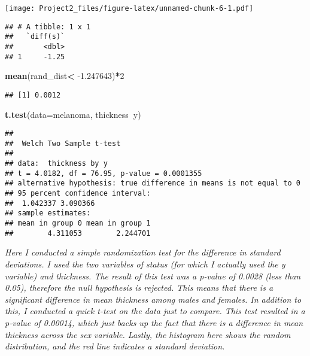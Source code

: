\documentclass[]{article}
\newenvironment{Shaded}{\begin{snugshade}}{\end{snugshade}}
\newcommand{\DataTypeTok}[1]{\textcolor[rgb]{0.13,0.29,0.53}{#1}}
\newcommand{\DecValTok}[1]{\textcolor[rgb]{0.00,0.00,0.81}{#1}}
\newcommand{\FloatTok}[1]{\textcolor[rgb]{0.00,0.00,0.81}{#1}}
\newcommand{\KeywordTok}[1]{\textcolor[rgb]{0.13,0.29,0.53}{\textbf{#1}}}
\newcommand{\NormalTok}[1]{#1}
\newcommand{\OperatorTok}[1]{\textcolor[rgb]{0.81,0.36,0.00}{\textbf{#1}}}
\newcommand{\StringTok}[1]{\textcolor[rgb]{0.31,0.60,0.02}{#1}}
\begin{document}
\texttt{[image: Project2\_files/figure-latex/unnamed-chunk-6-1.pdf]}

\begin{Shaded}
\end{Shaded}

\begin{verbatim}
## # A tibble: 1 x 1
##   `diff(s)`
##       <dbl>
## 1     -1.25
\end{verbatim}

\begin{Shaded}
\begin{Highlighting}[]
\KeywordTok{mean}\NormalTok{(rand_dist}\OperatorTok{<}\StringTok{ }\FloatTok{-1.247643}\NormalTok{)}\OperatorTok{*}\DecValTok{2}
\end{Highlighting}
\end{Shaded}

\begin{verbatim}
## [1] 0.0012
\end{verbatim}

\begin{Shaded}
\begin{Highlighting}[]
\KeywordTok{t.test}\NormalTok{(}\DataTypeTok{data=}\NormalTok{melanoma, thickness}\OperatorTok{~}\NormalTok{y)}
\end{Highlighting}
\end{Shaded}

\begin{verbatim}
## 
##  Welch Two Sample t-test
## 
## data:  thickness by y
## t = 4.0182, df = 76.95, p-value = 0.0001355
## alternative hypothesis: true difference in means is not equal to 0
## 95 percent confidence interval:
##  1.042337 3.090366
## sample estimates:
## mean in group 0 mean in group 1 
##        4.311053        2.244701
\end{verbatim}

\emph{Here I conducted a simple randomization test for the difference in
standard deviations. I used the two variables of status (for which I
actually used the y variable) and thickness. The result of this test was
a p-value of 0.0028 (less than 0.05), therefore the null hypothesis is
rejected. This means that there is a significant difference in mean
thickness among males and females. In addition to this, I conducted a
quick t-test on the data just to compare. This test resulted in a
p-value of 0.00014, which just backs up the fact that there is a
difference in mean thickness across the sex variable. Lastly, the
histogram here shows the random distribution, and the red line indicates
a standard deviation.}
\end{document}
